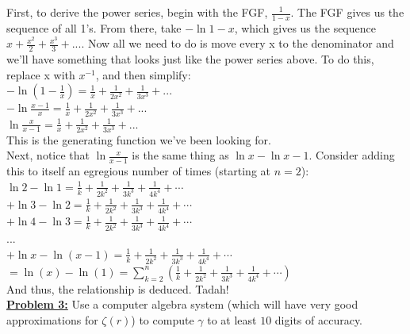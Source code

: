 \documentclass[10pt, AMS Euler]{article}
\begin{document}

    First, to derive the power series, begin with the FGF, $\frac{1}{1-x}$. The FGF gives us the sequence of all 1's. From there, take $-\ln{1-x}$, which gives us the sequence $x + \frac{x^2}{2} + \frac{x^3}{3} + ...$. Now all we need to do is move every x to the denominator and we'll have something that looks just like the power series above. To do this, replace x with $x^{-1}$, and then simplify:\\

    $-\ln(1-\frac{1}{x})=\frac{1}{x} + \frac{1}{2x^2} + \frac{1}{3x^3} +...$\\

    $-\ln{\frac{x-1}{x}}=\frac{1}{x} + \frac{1}{2x^2} + \frac{1}{3x^3} +...$\\
    
    $\ln{\frac{x}{x-1}}=\frac{1}{x} + \frac{1}{2x^2} + \frac{1}{3x^3} +...$\\

    This is the generating function we've been looking for.\\
    
    Next, notice that $\ln{\frac{x}{x-1}}$ is the same thing as $\ln{x} - \ln{x - 1}$. Consider adding this to itself an egregious number of times (starting at $n=2$):\\

    $\ln{2} - \ln{1} = \frac{1}{k} + \frac{1}{2k^2} + \frac{1}{3k^3} + \frac{1}{4k^4} + \cdots$\\
    $+\ln{3} - \ln{2} = \frac{1}{k} + \frac{1}{2k^2} + \frac{1}{3k^3} + \frac{1}{4k^4} + \cdots$\\
    $+\ln{4} - \ln{3} = \frac{1}{k} + \frac{1}{2k^2} + \frac{1}{3k^3} + \frac{1}{4k^4} + \cdots$\\
    $...$\\
    $+\ln{x} - \ln(x - 1) = \frac{1}{k} + \frac{1}{2k^2} + \frac{1}{3k^3} + \frac{1}{4k^4} + \cdots$\\
    $= \ln(x)-\ln(1) = \sum_{k =2}^n \left(\frac{1}{k} + \frac{1}{2k^2} + \frac{1}{3k^3} + \frac{1}{4k^4} + \cdots  \right)$\\
    
    And thus, the relationship is deduced. Tadah!\\
 
	\noindent\underline{{\bf Problem 3:}} Use a computer algebra system (which will have very good approximations for $\zeta(r)$) to compute $\gamma$ to at least $10$ digits of accuracy. \\ 
 
\end{document}
